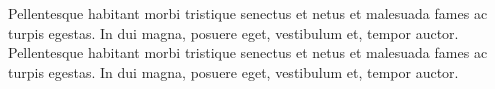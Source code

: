 Pellentesque habitant morbi tristique senectus et netus et malesuada fames ac turpis egestas. In dui magna, posuere eget, vestibulum et, tempor auctor. Pellentesque habitant morbi tristique senectus et netus et malesuada fames ac turpis egestas. In dui magna, posuere eget, vestibulum et, tempor auctor.